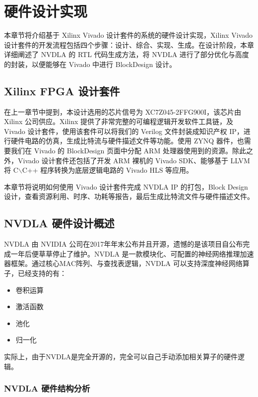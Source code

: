 \chapter{硬件设计实现}\label{chap:hardware}

本章节将介绍基于 Xilinx Vivado 设计套件的系统的硬件设计实现，Xilinx Vivado 设计套件的开发流程包括四个步骤：设计、综合、实现、生成。在设计阶段，本章详细阐述了 NVDLA 的 RTL 代码生成方法，将 NVDLA 进行了部分优化与高度的封装，以便能够在 Vivado 中进行 BlockDesign 设计。

\section{Xilinx FPGA 设计套件}

在上一章节中提到，本设计选用的芯片信号为 XC7Z045-2FFG900I，该芯片由 Xilinx 公司供应。Xilinx 提供了非常完整的可编程逻辑开发软件工具链，及 Vivado 设计套件，使用该套件可以将我们的 Verilog 文件封装成知识产权 IP，进行硬件电路的仿真，生成比特流与硬件描述文件等功能。使用 ZYNQ 器件，也需要我们在 Vivado 的 BlockDesign 页面中分配 ARM 处理器使用到的资源。除此之外，Vivado 设计套件还包括了开发 ARM 裸机的 Vivado SDK、能够基于 LLVM 将 C$\backslash$C++ 程序转换为底层逻辑电路的 Vivado HLS 等应用。

本章节将说明如何使用 Vivado 设计套件完成 NVDLA IP 的打包，Block Design 设计，查看资源利用、时序、功耗等报告，最后生成比特流文件与硬件描述文件。 

\section{NVDLA 硬件设计概述}

NVDLA 由 NVIDIA 公司在2017年年末公布并且开源，遗憾的是该项目自公布完成一年后便草草停止了维护。NVDLA 是一款模块化、可配置的神经网络推理加速器框架。通过核心MAC阵列、与查找表逻辑，NVDLA 可以支持深度神经网络算子，已经支持的有：

\begin{itemize}
    \item 卷积运算
    \item 激活函数
    \item 池化
    \item 归一化
\end{itemize}

实际上，由于NVDLA是完全开源的，完全可以自己手动添加相关算子的硬件逻辑。

\subsection{NVDLA 硬件结构分析}

